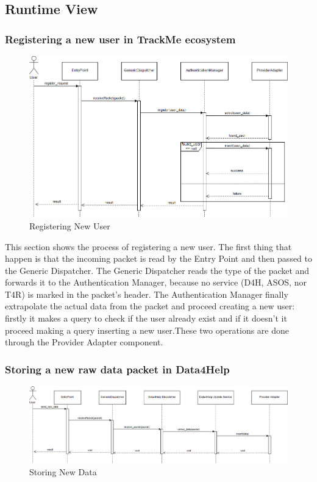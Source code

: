 \newpage
{\color{secblue}\subsection{Runtime View}}
{\color{secblue}\subsubsection{Registering a new user in TrackMe ecosystem}}
\begin{figure}[H]
    \includegraphics[width=\linewidth, keepaspectratio]{./Images/registering_new_user.png}
    \centering
    \caption{Registering New User}
    \label{fig:depview}
  \end{figure}
This section shows the process of registering a new user. The first thing that happen is that the incoming packet is read by the Entry Point and then passed to the Generic Dispatcher. The Generic Dispatcher reads the type of the packet and forwards it to the Authentication Manager, because no service (D4H, ASOS, nor T4R) is marked in the packet's header. The Authentication Manager finally extrapolate the actual data from the packet and proceed creating a new user: firstly it makes a query to check if the user already exist and if it doesn't it proceed making a query inserting a new user.These two operations are done through the Provider Adapter component.
{\color{secblue}\subsubsection{Storing a new raw data packet in Data4Help}}
\begin{figure}[H]
    \includegraphics[width=\linewidth, keepaspectratio]{./Images/storing_new_data.png}
    \centering
    \caption{Storing New Data}
    \label{fig:depview}
  \end{figure}
